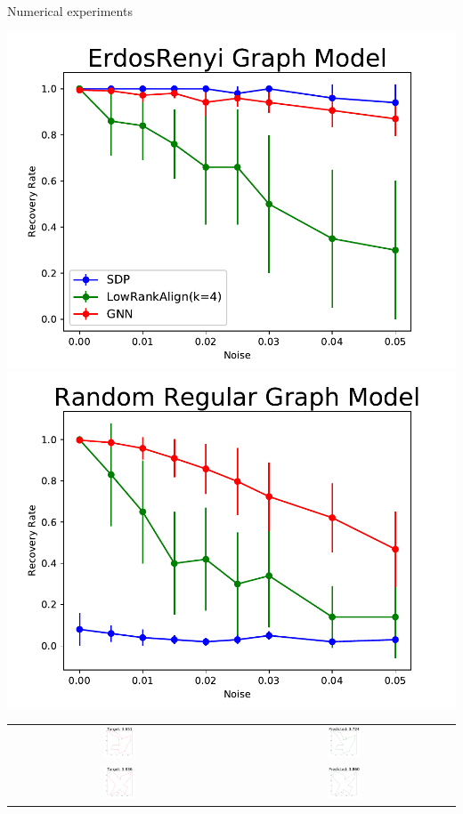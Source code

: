 \documentclass{beamer}
\begin{document}
\begin{frame}{Numerical experiments}
\begin{center}
\includegraphics[width=.45\textwidth]{figs/ErdosRenyi}
\includegraphics[width=.45\textwidth]{figs/regular}
\end{center}

\pause
\vfill
\begin{center}
\begin{tabular}{cc}
	\includegraphics[width=0.15\textwidth]{figs/ground_tsp4.pdf} &
	\includegraphics[width=0.15\textwidth]{figs/pred_tsp4.pdf} \\
	\includegraphics[width=0.15\textwidth]{figs/ground_tsp0.pdf} &
	\includegraphics[width=0.15\textwidth]{figs/pred_tsp0.pdf} 
\end{tabular}	
\end{center}
\let\thefootnote\relax{}
\end{frame}
\end{document}

